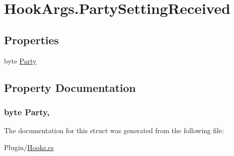 \hypertarget{structOTA_1_1Plugin_1_1HookArgs_1_1PartySettingReceived}{}\section{Hook\+Args.\+Party\+Setting\+Received}
\label{structOTA_1_1Plugin_1_1HookArgs_1_1PartySettingReceived}
\subsection*{Properties}
\begin{DoxyCompactItemize}
\item 
byte \hyperlink{structOTA_1_1Plugin_1_1HookArgs_1_1PartySettingReceived_a399caad2cf0c03cfda75c9cfe6bb0319}{Party}
\end{DoxyCompactItemize}


\subsection{Property Documentation}
\hypertarget{structOTA_1_1Plugin_1_1HookArgs_1_1PartySettingReceived_a399caad2cf0c03cfda75c9cfe6bb0319}{}
\subsubsection[{Party}]{\setlength{\rightskip}{0pt plus 5cm}byte Party\hspace{0.3cm}{\ttfamily [get]}, {\ttfamily [set]}}\label{structOTA_1_1Plugin_1_1HookArgs_1_1PartySettingReceived_a399caad2cf0c03cfda75c9cfe6bb0319}


The documentation for this struct was generated from the following file\+:\begin{DoxyCompactItemize}
\item 
Plugin/\hyperlink{Hooks_8cs}{Hooks.\+cs}\end{DoxyCompactItemize}
